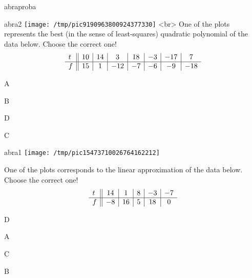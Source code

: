 \documentclass[12pt]{article}
\begin{document}
\begin{quiz}{abraproba}\begin{multi}{abra2}
\texttt{[image: /tmp/pic9190963800924377330]}
<br>
One of the plots represents the best (in the sense of least-squares) 
quadratic polynomial of the data below.
Choose the correct one!
$$\begin{array}{l ||c|c|c|c|c|c|c}t&10&14&3&18&-3&-17&7\\ \hline f&15&1&-12&-7&-6&-9&-18 \\ \end{array}$$
  \item* A
    \item  B
    \item  D
    \item  C
    \end{multi}
    

\begin{multi}{abra1}
\texttt{[image: /tmp/pic15473710026764162212]}

One of the plots corresponds to the linear approximation of the data below.
Choose the correct one!
$$\begin{array}{l ||c|c|c|c|c}t&14&1&8&-3&-7\\ \hline f&-8&16&5&18&0 \\ \end{array}$$
  \item* D
    \item  A
    \item  C
    \item  B
    \end{multi}\end{quiz}
\end{document}
